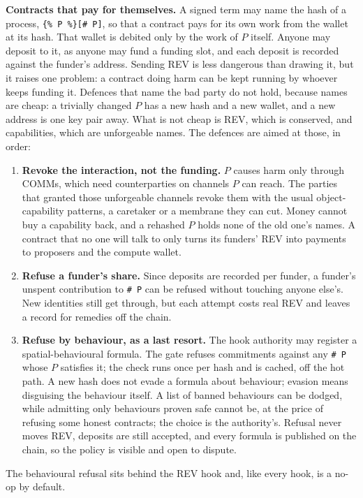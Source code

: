 \documentclass[11pt]{article}
\newcommand{\signed}[2]{\texttt{\{\%\,#1\,\%\}[#2]}}
\begin{document}
\textbf{Contracts that pay for themselves.} A signed term may name the hash of a process, \signed{P}{\# P}, so that a contract pays for its own work from the wallet at its hash. That wallet is debited only by the work of $P$ itself. Anyone may deposit to it, as anyone may fund a funding slot, and each deposit is recorded against the funder's address. Sending REV is less dangerous than drawing it, but it raises one problem: a contract doing harm can be kept running by whoever keeps funding it. Defences that name the bad party do not hold, because names are cheap: a trivially changed $P$ has a new hash and a new wallet, and a new address is one key pair away. What is not cheap is REV, which is conserved, and capabilities, which are unforgeable names. The defences are aimed at those, in order:
\begin{enumerate}
\item \textbf{Revoke the interaction, not the funding.} $P$ causes harm only through COMMs, which need counterparties on channels $P$ can reach. The parties that granted those unforgeable channels revoke them with the usual object-capability patterns, a caretaker or a membrane they can cut. Money cannot buy a capability back, and a rehashed $P$ holds none of the old one's names. A contract that no one will talk to only turns its funders' REV into payments to proposers and the compute wallet.
\item \textbf{Refuse a funder's share.} Since deposits are recorded per funder, a funder's unspent contribution to \texttt{\# P} can be refused without touching anyone else's. New identities still get through, but each attempt costs real REV and leaves a record for remedies off the chain.
\item \textbf{Refuse by behaviour, as a last resort.} The hook authority may register a spatial-behavioural formula. The gate refuses commitments against any \texttt{\# P} whose $P$ satisfies it; the check runs once per hash and is cached, off the hot path. A new hash does not evade a formula about behaviour; evasion means disguising the behaviour itself. A list of banned behaviours can be dodged, while admitting only behaviours proven safe cannot be, at the price of refusing some honest contracts; the choice is the authority's. Refusal never moves REV, deposits are still accepted, and every formula is published on the chain, so the policy is visible and open to dispute.
\end{enumerate}
The behavioural refusal sits behind the REV hook and, like every hook, is a no-op by default.
\end{document}
